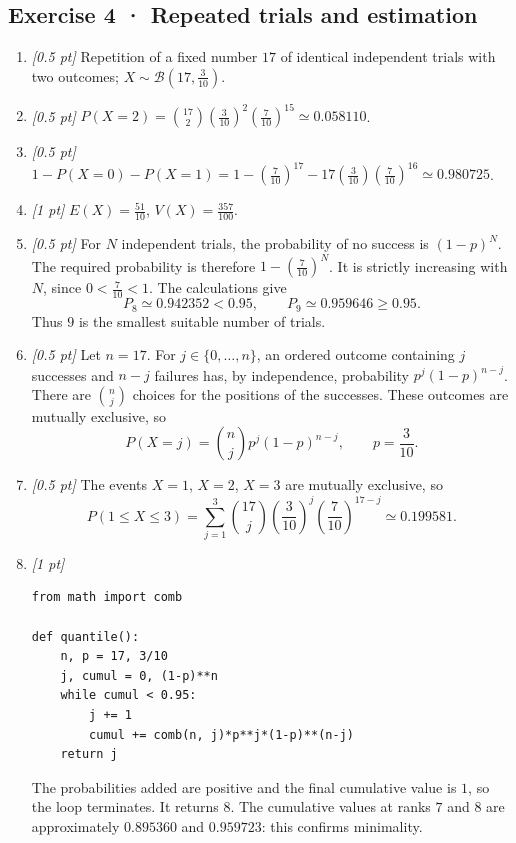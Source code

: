 \subsection*{Exercise 4 · Repeated trials and estimation}\begin{enumerate}

\item \textit{[0.5 pt]} Repetition of a fixed number $17$ of identical independent trials with two outcomes; $X\sim\mathcal B(17,\frac{3}{10})$.

\item \textit{[0.5 pt]} $P(X=2)=\binom{17}2(\frac{3}{10})^2(\frac{7}{10})^{15}\simeq\num{0,058110}$.

\item \textit{[0.5 pt]} $1-P(X=0)-P(X=1)=1-(\frac{7}{10})^{17}-17(\frac{3}{10})(\frac{7}{10})^{16}\simeq\num{0,980725}$.

\item \textit{[1 pt]} $E(X)=\frac{51}{10}$, $V(X)=\frac{357}{100}$.

\item \textit{[0.5 pt]} For $N$ independent trials, the probability of no success is $(1-p)^N$. The required probability is therefore $1-(\frac{7}{10})^N$. It is strictly increasing with $N$, since $0<\frac{7}{10}<1$. The calculations give
\[P_{8}\simeq\num{0,942352}<\num{0,95},\qquad P_{9}\simeq\num{0,959646}\ge\num{0,95}.\]
Thus $9$ is the smallest suitable number of trials.

\item \textit{[0.5 pt]} Let $n=17$. For $j\in\{0,\ldots,n\}$, an ordered outcome containing $j$ successes and $n-j$ failures has, by independence, probability $p^j(1-p)^{n-j}$. There are $\binom nj$ choices for the positions of the successes. These outcomes are mutually exclusive, so
\[P(X=j)=\binom nj p^j(1-p)^{n-j},\qquad p=\frac{3}{10}.\]

\item \textit{[0.5 pt]} The events $X=1$, $X=2$, $X=3$ are mutually exclusive, so
\[P(1\le X\le3)=\sum_{j=1}^3\binom{17}j(\frac{3}{10})^j(\frac{7}{10})^{17-j}\simeq\num{0,199581}.\]


\item \textit{[1 pt]} 
\begin{lstlisting}
from math import comb

def quantile():
    n, p = 17, 3/10
    j, cumul = 0, (1-p)**n
    while cumul < 0.95:
        j += 1
        cumul += comb(n, j)*p**j*(1-p)**(n-j)
    return j
\end{lstlisting}
The probabilities added are positive and the final cumulative value is $1$, so the loop terminates. It returns $8$. The cumulative values at ranks $7$ and $8$ are approximately $\num{0,895360}$ and $\num{0,959723}$: this confirms minimality.

\end{enumerate}

